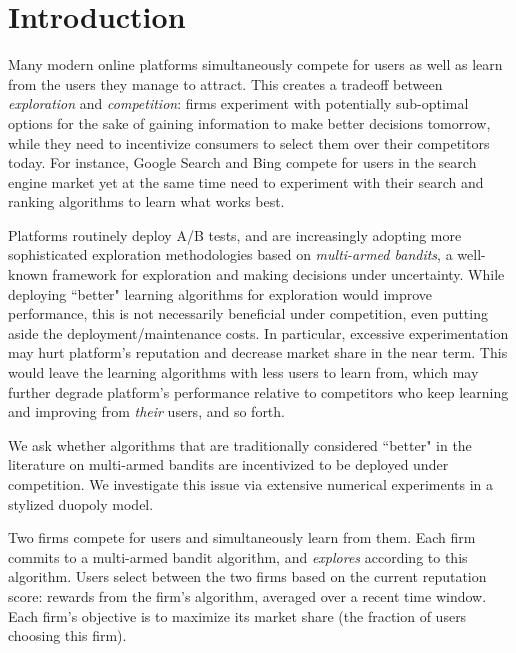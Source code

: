 \documentclass[../competing_bandits_with_appendix.tex]{subfiles}
\begin{document}
\section{Introduction}\label{sec:intro}

Many modern online platforms simultaneously compete for users as well as learn from the users they manage to attract. This creates a tradeoff between \textit{exploration} and \textit{competition}: firms experiment with potentially sub-optimal options for the sake of gaining information to make better decisions tomorrow, while they need to incentivize consumers to select them over their competitors today. For instance, Google Search and Bing compete for users in the search engine market yet at the same time need to experiment with their search and ranking algorithms to learn what works best. 

Platforms routinely deploy A/B tests, and are increasingly adopting  more sophisticated exploration methodologies based on \emph{multi-armed bandits}, a well-known framework for exploration and making decisions under uncertainty. While deploying ``better" learning algorithms for exploration would improve performance, this is not necessarily beneficial under competition, even putting aside the deployment/maintenance costs. In particular, excessive experimentation may hurt platform's reputation and decrease market share in the near term. This would leave the learning algorithms with less users to learn from, which may further degrade platform's performance relative to competitors who keep learning and improving from \emph{their} users, and so forth.

We ask whether algorithms that are traditionally considered ``better" in the literature on multi-armed bandits are incentivized to be deployed under competition. We investigate this issue via extensive numerical experiments in a stylized duopoly model. 

 Two firms compete for users and simultaneously learn from them. Each firm commits to a multi-armed bandit algorithm, and \emph{explores} according to this algorithm. Users select between the two firms based on the current reputation score: rewards from the firm's algorithm, averaged over a recent time window. Each firm's objective is to maximize its  market share (the fraction of users choosing this firm).
\end{document}
